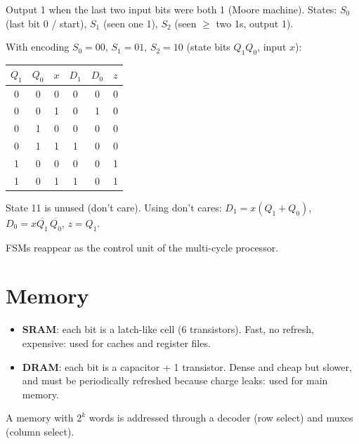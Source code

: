 \begin{example}
Output 1 when the last two input bits were both 1 (Moore machine).
States: $S_0$ (last bit 0 / start), $S_1$ (seen one 1), $S_2$ (seen
$\ge$ two 1s, output 1).

\begin{figure}[H]
\centering
{}
\end{figure}

With encoding $S_0 = 00$, $S_1 = 01$, $S_2 = 10$ (state bits $Q_1Q_0$,
input $x$):
\begin{center}
\begin{tabular}{cc|c|cc|c}
\toprule
$Q_1$ & $Q_0$ & $x$ & $D_1$ & $D_0$ & $z$ \\
\midrule
0&0&0&0&0&0\\
0&0&1&0&1&0\\
0&1&0&0&0&0\\
0&1&1&1&0&0\\
1&0&0&0&0&1\\
1&0&1&1&0&1\\
\bottomrule
\end{tabular}
\end{center}
State 11 is unused (don't care). Using don't cares:
$D_1 = x(Q_1 + Q_0)$, $D_0 = x\overline{Q_1}\,\overline{Q_0}$, $z = Q_1$.
\end{example}

FSMs reappear as the control unit of the multi-cycle processor.

\section{Memory}

\begin{itemize}
  \item \textbf{SRAM}: each bit is a latch-like cell (6 transistors). Fast,
    no refresh, expensive: used for caches and register files.
  \item \textbf{DRAM}: each bit is a capacitor + 1 transistor. Dense and
    cheap but slower, and must be periodically refreshed because charge
    leaks: used for main memory.
\end{itemize}
A memory with $2^k$ words is addressed through a decoder (row select) and
muxes (column select).

